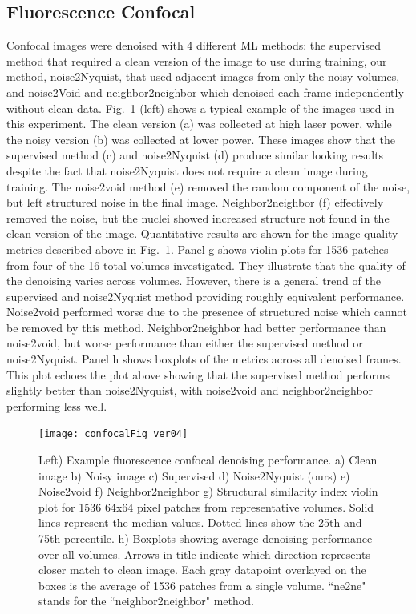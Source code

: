 \documentclass[12pt]{spieman}
\begin{document}
\begin{spacing}{2}
\subsection{Fluorescence Confocal}
Confocal images were denoised with 4 different ML methods: the supervised method that required a clean version of the image to use during training, our method, noise2Nyquist, that used adjacent images from only the noisy volumes, and noise2Void and neighbor2neighbor which denoised each frame independently without clean data. Fig.~\ref{fig:confocalResults} (left) shows a typical example of the images used in this experiment. The clean version (a) was collected at high laser power, while the noisy version (b) was collected at lower power. These images show that the supervised method (c) and noise2Nyquist (d) produce similar looking results despite the fact that noise2Nyquist does not require a clean image during training. The noise2void method (e) removed the random component of the noise, but left structured noise in the final image. Neighbor2neighbor (f) effectively removed the noise, but the nuclei showed increased structure not found in the clean version of the image. Quantitative results are shown for the image quality metrics described above in Fig.~\ref{fig:confocalResults}. Panel g shows violin plots for 1536 patches from four of the 16 total volumes investigated. They illustrate that the quality of the denoising varies across volumes. However, there is a general trend of the supervised and noise2Nyquist method providing roughly equivalent performance. Noise2void performed worse due to the presence of structured noise which cannot be removed by this method. Neighbor2neighbor had better performance than noise2void, but worse performance than either the supervised method or noise2Nyquist. Panel h shows boxplots of the metrics across all denoised frames. This plot echoes the plot above showing that the supervised method performs slightly better than noise2Nyquist, with noise2void and neighbor2neighbor performing less well.
\begin{figure}[htb]
	\begin{center}
		\texttt{[image: confocalFig\_ver04]}
		\caption{\label{fig:confocalResults}Left) Example fluorescence confocal denoising performance. a) Clean image b) Noisy image c) Supervised  d) Noise2Nyquist (ours) e) Noise2void f) Neighbor2neighbor g) Structural similarity index violin plot for 1536 64x64 pixel patches from representative volumes. Solid lines represent the median values. Dotted lines show the 25th and 75th percentile. h) Boxplots showing average denoising performance over all volumes. Arrows in title indicate which direction represents closer match to clean image. Each gray datapoint overlayed on the boxes is the average of 1536 patches from a single volume. ``ne2ne" stands for the ``neighbor2neighbor" method.}
	\end{center}
\end{figure}


\end{spacing}
\end{document}
